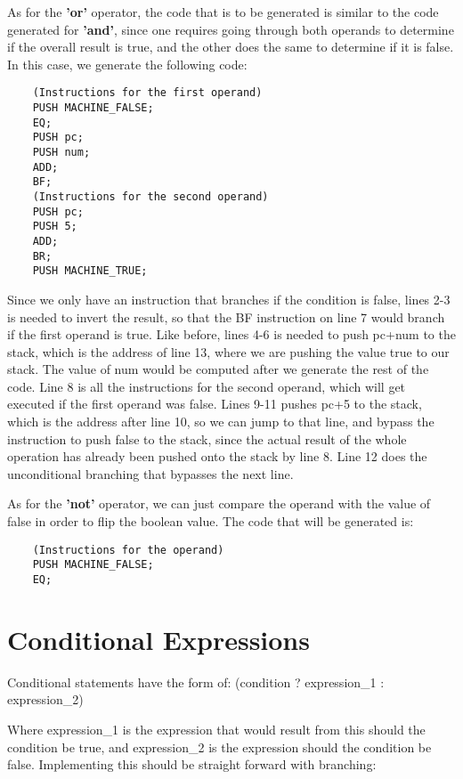 \documentclass{article}
\begin{document}
As for the \textbf{'or'} operator, the code that is to be generated is similar to the code generated for \textbf{'and'}, since one requires going through both operands to determine if the overall result is true, and the other does the same to determine if it is false. In this case, we generate the following code:

\begin{lstlisting}
    (Instructions for the first operand)
    PUSH MACHINE_FALSE;
    EQ;
    PUSH pc;
    PUSH num;
    ADD;
    BF;
    (Instructions for the second operand)
    PUSH pc;
    PUSH 5;
    ADD;
    BR;
    PUSH MACHINE_TRUE;
\end{lstlisting}

Since we only have an instruction that branches if the condition is false, lines 2-3 is needed to invert the result, so that the BF instruction on line 7 would branch if the first operand is true. Like before, lines 4-6 is needed to push pc+num to the stack, which is the address of line 13, where we are pushing the value true to our stack. The value of num would be computed after we generate the rest of the code. Line 8 is all the instructions for the second operand, which will get executed if the first operand was false. Lines 9-11 pushes pc+5 to the stack, which is the address after line 10, so we can jump to that line, and bypass the instruction to push false to the stack, since the actual result of the whole  operation has already been pushed onto the stack by line 8. Line 12 does the unconditional branching that bypasses the next line.

As for the \textbf{'not'} operator, we can just compare the operand with the value of false in order to flip the boolean value. The code that will be generated is:

\begin{lstlisting}
    (Instructions for the operand)
    PUSH MACHINE_FALSE;
    EQ;
\end{lstlisting}

\section{Conditional Expressions}

Conditional statements have the form of: (condition ? expression\_1 : expression\_2)

Where expression\_1 is the expression that would result from this should the condition be true, and expression\_2 is the expression should the condition be false. Implementing this should be straight forward with branching:
\end{document}
